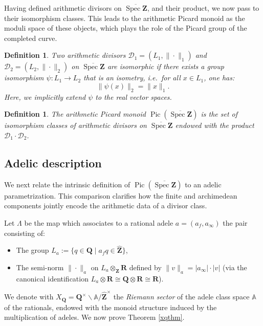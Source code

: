 \documentclass[11pt,a4paper]{article}
\newcommand{\Q}{\mathbf{Q}}
\newcommand{\Z}{\mathbf{Z}}
\newcommand{\R}{\mathbf{R}}
\newcommand{\A}{\mathbb{A}}
\newcommand{\Zhat}{\widehat{\Z}}
\def\spzb{\overline{\Spec \Z}}
\newcommand{\Spec}{\operatorname{Spec}}
\def\Pic{\operatorname{Pic}}
\def\ie{{\it i.e.\/}\ }
\theoremstyle{plain}
\newtheorem{defn}[thm]{Definition}
\theoremstyle{definition} %
\begin{document}
Having defined arithmetic divisors on $\spzb$, and their product, we now pass to their isomorphism
classes.
This leads to the arithmetic Picard monoid as the moduli space of these objects, which plays the role of the Picard group of
the completed curve.



\begin{defn}
Two arithmetic divisors $\mathcal D_1=(L_1, \|\cdot\|_1)$ and $\mathcal D_2=(L_2, \|\cdot\|_2)$ on $\spzb$ are isomorphic if there exists a group isomorphism $\psi: L_1 \to L_2$ that is an isometry, \ie  for all $x \in L_1$, one has:
\[
\|\psi(x)\|_2 = \|x\|_1.
\]
Here, we implicitly extend $\psi$ to the real vector spaces.
\end{defn}

\begin{defn}
The arithmetic Picard monoid $\Pic(\spzb)$  is the set of isomorphism classes of arithmetic divisors on $\spzb$ endowed with the product $\mathcal{D}_1 \cdot \mathcal{D}_2$.
\end{defn}

\subsection{Adelic description}\label{adrel} 

We next relate the intrinsic definition of $\Pic(\spzb)$ to an adelic
parametrization.
This comparison clarifies how the finite and archimedean components jointly encode
the arithmetic data of a divisor class.\vspace{.03in}


      
      Let $\Lambda$ be the map which associates to a rational adele $a=(a_f,a_\infty)$ the pair consisting of:
\begin{itemize}[leftmargin=*, labelindent=0pt]
    \item The group $L_a := \{q \in \Q \mid a_f q \in \widehat{\Z}\}$,
    \item The semi-norm $\|\cdot\|_a$ on $L_a \otimes_\Z \R$ defined by $\|v\|_a = |a_\infty| \cdot |v|$ (via the canonical identification $L_a \otimes \R \cong\Q\otimes \R\cong \R$).
\end{itemize}
We denote with $X_\Q=\Q^\times \backslash \A / \Zhat^\times$  the \emph{Riemann sector} of the adele class space $\A$ of the rationals, endowed with the monoid structure induced by the multiplication of adeles. We now prove Theorem \ref{xqthm}.
\end{document}
